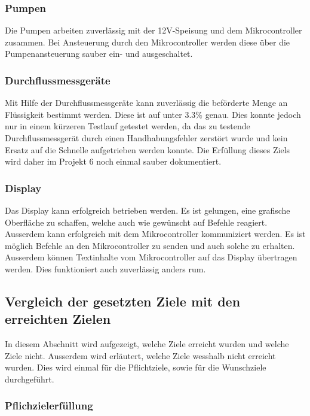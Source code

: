 \subsubsection{Pumpen}
\label{subsubsec:Fazit_Pumpen}

Die Pumpen arbeiten zuverlässig mit der 12V-Speisung und dem Mikrocontroller zusammen. Bei Ansteuerung durch den Mikrocontroller werden diese über die Pumpenansteuerung sauber ein- und ausgeschaltet.

\subsubsection{Durchflussmessgeräte}
\label{subsubsec:Fazit_Durchflussmessgeräte}

Mit Hilfe der Durchflussmessgeräte kann zuverlässig die beförderte Menge an Flüssigkeit bestimmt werden. Diese ist auf unter 3.3\% genau. Dies konnte jedoch nur in einem kürzeren Testlauf getestet werden, da das zu testende Durchflussmessgerät durch einen Handhabungsfehler zerstört wurde und kein Ersatz auf die Schnelle aufgetrieben werden konnte. Die Erfüllung dieses Ziels wird daher im Projekt 6 noch einmal sauber dokumentiert. 

\subsubsection{Display}
\label{subsubsec:Fazit_Display}

Das Display kann erfolgreich betrieben werden. Es ist gelungen, eine grafische Oberfläche zu schaffen, welche auch wie gewünscht auf Befehle reagiert. Ausserdem kann erfolgreich mit dem Mikrocontroller kommuniziert werden. Es ist möglich Befehle an den Mikrocontroller zu senden und auch solche zu erhalten. Ausserdem können Textinhalte vom Mikrocontroller auf das Display übertragen werden. Dies funktioniert auch zuverlässig anders rum. 

\subsection{Vergleich der gesetzten Ziele mit den erreichten Zielen}
\label{subsec:Zielerreichung}

In diesem Abschnitt wird aufgezeigt, welche Ziele erreicht wurden und welche Ziele nicht. Ausserdem wird erläutert, welche Ziele wesshalb nicht erreicht wurden. Dies wird einmal für die Pflichtziele, sowie für die Wunschziele durchgeführt.

\subsubsection{Pflichzielerfüllung}
\label{subsubsec:Pflichtzielerfüllung}

